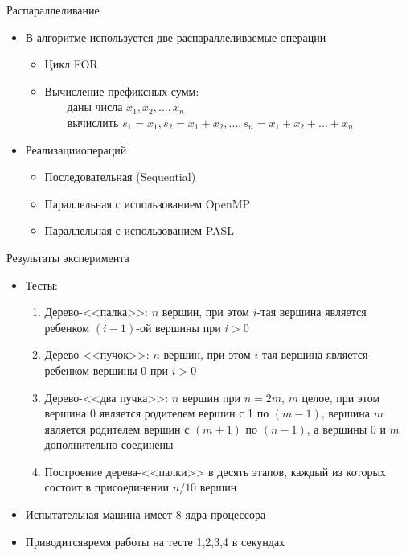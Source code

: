 \documentclass[hyperref=unicode,graphics=pdflatex,13pt]{beamer}
\begin{document}
\begin{frame}[shrink]{Распараллеливание}
\begin{itemize}
    \item В алгоритме используется две распараллеливаемые операции
        \begin{itemize}
            \item Цикл FOR
            \item Вычисление префиксных сумм:
                  \\~~~~даны числа $x_{1}, x_{2}, ..., x_{n}$
                  \\~~~~вычислить $s_{1}=x_{1}, s_{2}=x_{1}+x_{2}, ..., s_{n}=x_{1}+x_{2}+...+x_{n}$
        \end{itemize}
    \item Реализацииопераций
        \begin{itemize}
            \item Последовательная (Sequential)
            \item Параллельная с использованием OpenMP
            \item Параллельная с использованием PASL
        \end{itemize}
\end{itemize}
\end{frame}

\begin{frame}[shrink]{Результаты эксперимента}
\begin{itemize}
    \item Тесты:
	\begin{enumerate}
	    \item Дерево-<<палка>>: $n$ вершин, при этом $i$-тая вершина является ребенком $(i-1)$-ой 
	вершины при $i > 0$
	    \item Дерево-<<пучок>>: $n$ вершин, при этом $i$-тая вершина является ребенком вершины 0 при 
	$i > 0$
	    \item Дерево-<<два пучка>>: $n$ вершин при $n = 2m$, $m$ целое, при этом вершина 0 является 
	родителем вершин с 1 по $(m-1)$, 
	вершина $m$ является родителем вершин с $(m+1)$ по $(n-1)$, а вершины 0 и $m$ 
	дополнительно соединены
	    \item Построение дерева-<<палки>> в десять этапов, каждый из которых состоит в присоединении 
	$n / 10$ вершин
	\end{enumerate}
    \item Испытательная машина имеет 8 ядра процессора
    \item Приводитсявремя работы на тесте 1,2,3,4 в секундах
\end{itemize}
\end{frame}
\end{document}
